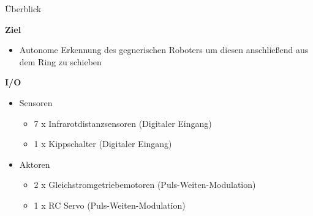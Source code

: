\documentclass{beamer}
\begin{document}
\begin{frame}{\"Uberblick}
\begin{large}\textbf{Ziel}\end{large}
\begin{itemize}
	\item Autonome Erkennung des gegnerischen Roboters um diesen anschlie\ss{}end aus dem Ring zu schieben
\end{itemize}
\vspace{20px}
\begin{large}\textbf{I/O}\end{large}
\begin{itemize}
	\item Sensoren
	\begin{itemize}
		\item 7 x Infrarotdistanzsensoren (Digitaler Eingang)
		\item 1 x Kippschalter (Digitaler Eingang)
	\end{itemize}
	\item Aktoren
	\begin{itemize}
		\item 2 x Gleichstromgetriebemotoren (Puls-Weiten-Modulation)
		\item 1 x RC Servo (Puls-Weiten-Modulation)
	\end{itemize}
\end{itemize}
\end{frame}
\end{document}

